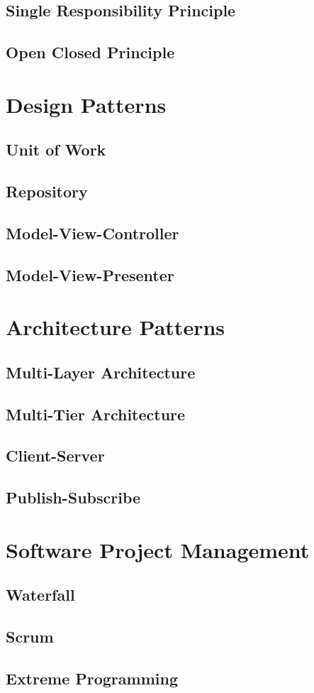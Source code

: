 \subsection{Single Responsibility Principle}

\subsection{Open Closed Principle}

\section{Design Patterns}
\subsection{Unit of Work}
\subsection{Repository}
\subsection{Model-View-Controller}
\subsection{Model-View-Presenter}

\section{Architecture Patterns}
\subsection{Multi-Layer Architecture}
\subsection{Multi-Tier Architecture}
\subsection{Client-Server}
\subsection{Publish-Subscribe}

\section{Software Project Management}
\subsection{Waterfall}
\subsection{Scrum}
\subsection{Extreme Programming}
\newpage
